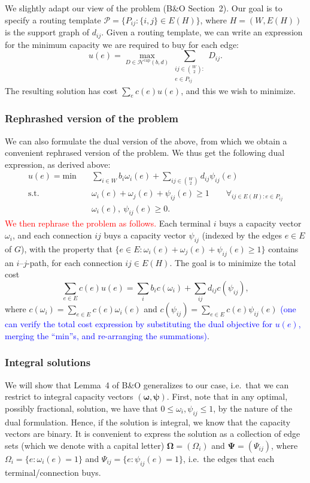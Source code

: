 \documentclass[11pt]{article}
\begin{document}
    We slightly adapt our view of the problem (B\&O Section~2).
    Our goal is to specify a routing template $\mathcal P = \{ P_{ij} : \{i, j\} \in E(H) \}$, where $H = (W, E(H))$ is the support graph of $d_{ij}$.
    Given a routing template, we can write an expression for the minimum capacity we are required to buy for each edge:
    \[
        u(e) = \max_{D \in \mathcal H^\text{cap}(b, d)} \sum_{\substack{ij \in \binom W 2 :\\e \in P_{ij}}} D_{ij}.
    \]
    The resulting solution has cost $\sum_e c(e) u(e)$, and this we wish to minimize.

    \subsubsection*{Rephrashed version of the problem}
    We can also formulate the dual version of the above, from which we obtain a convenient rephrased version of the problem.
    We thus get the following dual expression, as derived above:
    \[
        \begin{split}
            u(e) = \text{min}\quad & \sum_{i \in W} b_i \omega_i(e) + \sum_{ij \in \binom W 2} d_{ij} \psi_{ij}(e) \\
            \text{s.t.}\quad & \omega_i(e) + \omega_j(e) + \psi_{ij}(e) \ge 1 \qquad \forall_{ij \in E(H) : e \in P_{ij}} \\
            & \omega_i(e),\ \psi_{ij}(e) \ge 0.
        \end{split}
    \]
    \textcolor{red}{We then rephrase the problem as follows.}
    Each terminal $i$ buys a capacity vector $\omega_i$, and each connection $ij$ buys a capacity vector $\psi_{ij}$ (indexed by the edges $e \in E$ of $G$), with the property that $\{ e \in E : \omega_i(e) + \omega_j(e) + \psi_{ij}(e) \ge 1 \}$ contains an $i$--$j$-path, for each connection $ij \in E(H)$.
    The goal is to minimize the total cost
    \[
        \sum_{e \in E} c(e) u(e) = \sum_{i} b_i c(\omega_i) + \sum_{ij} d_{ij} c(\psi_{ij}),
    \]
    where $c(\omega_i) = \sum_{e \in E} c(e) \omega_i(e)$ and $c(\psi_{ij}) = \sum_{e \in E} c(e) \psi_{ij}(e)$ \textcolor{blue}{(one can verify the total cost expression by substituting the dual objective for $u(e)$, merging the ``min''s, and re-arranging the summations)}.

    \subsubsection*{Integral solutions}
    We will show that Lemma~4 of B\&O generalizes to our case, i.e.\ that we can restrict to integral capacity vectors $(\boldsymbol \omega, \boldsymbol \psi)$.
    First, note that in any optimal, possibly fractional, solution, we have that $0 \le \omega_i, \psi_{ij} \le 1$, by the nature of the dual formulation.
    Hence, if the solution is integral, we know that the capacity vectors are binary.
    It is convenient to express the solution as a collection of edge sets (which we denote with a capital letter) $\boldsymbol \Omega = (\Omega_i)$ and $\boldsymbol \Psi = (\Psi_{ij})$, where $\Omega_i = \{ e : \omega_i(e) = 1 \}$ and $\Psi_{ij} = \{ e : \psi_{ij}(e) = 1 \}$, i.e.\ the edges that each terminal/connection buys.
\end{document}
